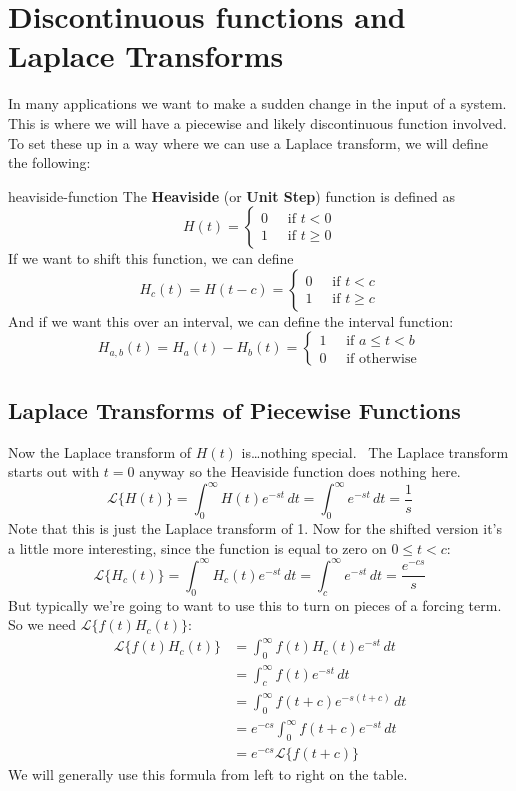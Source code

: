 \documentclass[letterpaper, 11pt, openany]{book}
\theoremstyle{mytheoremstyle}
\theoremstyle{myexamplestyle}
\begin{document}
\section{Discontinuous functions and Laplace Transforms}
\setcounter{figure}{0}
In many applications we want to make a sudden change in the input of a system. This is where we will have a piecewise and likely discontinuous function involved. To set these up in a way where we can use a Laplace transform, we will define the following:

\begin{definition}{}{heaviside-function}
    The \textbf{Heaviside} (or \textbf{Unit Step}) function is defined as
    \[H(t) = \begin{cases}
        0 \; &\text{ if } t<0\\
        1 \; &\text{ if } t\geq 0
    \end{cases}\]
    If we want to shift this function, we can define
    \[H_{c}(t) = H(t-c) = \begin{cases}
        0 \; &\text{ if } t<c\\
        1 \; &\text{ if } t\geq c
    \end{cases}\]
    And if we want this over an interval, we can define the interval function:
    \[H_{a,b}(t) = H_{a}(t) - H_{b}(t) = \begin{cases}
        1\; &\text{ if } a \leq t < b\\
        0\; &\text{ if }\text{otherwise}
    \end{cases}
    \]
\end{definition}

\subsection{Laplace Transforms of Piecewise Functions}

Now the Laplace transform of \(H(t)\) is\dots nothing special. \faMeh \ The Laplace transform starts out with \(t=0\) anyway so the Heaviside function does nothing here.
\[\mathcal{L}\{H(t)\} = \int_{0}^{\infty} H(t) e^{-st}\, dt = \int_{0}^{\infty} e^{-st}\, dt = \frac{1}{s}\]
Note that this is just the Laplace transform of 1. Now for the shifted version it's a little more interesting, since the function is equal to zero on \(0 \leq t < c\):
\[\mathcal{L}\{H_c (t)\} = \int_{0}^{\infty} H_c (t) e^{-st}\, dt = \int_{c}^{\infty} e^{-st} \, dt = \frac{e^{-cs}}{s}\]
But typically we're going to want to use this to turn on pieces of a forcing term. So we need \(\mathcal{L}\{f(t)H_{c}(t)\}\):
\begin{align*}
    \mathcal{L}\{f(t) H_c (t)\} &= \int_{0}^{\infty} f(t)H_c (t) e^{-st}\, dt\\
                                &=\int_{c}^{\infty} f(t)e^{-st} \, dt\\
                                &=\int_{0}^{\infty} f(t+c)e^{-s(t+c)}\, dt\\
                                &=e^{-cs}\int_{0}^{\infty} f(t+c)e^{-st}\, dt\\
                                &= e^{-cs} \mathcal{L}\{f(t + c)\}
\end{align*}
We will generally use this formula from left to right on the table.
\end{document}
